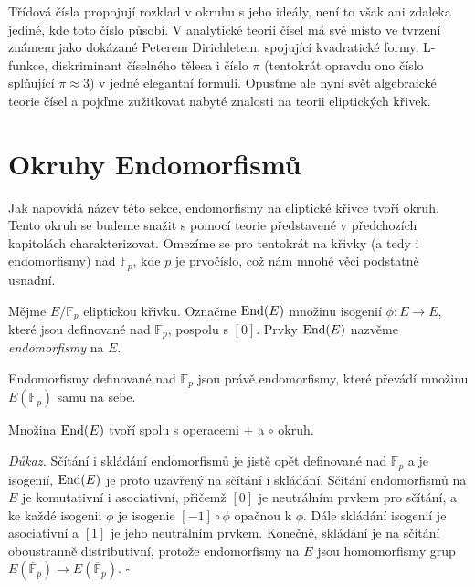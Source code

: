 \documentclass[12pt]{report}
\begin{document}
Třídová čísla propojují rozklad v okruhu s jeho ideály, není to však ani zdaleka jediné, kde toto číslo působí. V analytické teorii čísel má své místo ve tvrzení známem jako  dokázané Peterem Dirichletem, spojující kvadratické formy, L-funkce, diskriminant číselného tělesa i číslo $\pi$ (tentokrát opravdu ono číslo splňující $\pi \approx 3$) v jedné elegantní formuli. Opusťme ale nyní svět algebraické teorie čísel a pojďme zužitkovat nabyté znalosti na teorii eliptických křivek.
 
 
\chapter{Okruhy Endomorfismů} 
 
Jak napovídá název této sekce, endomorfismy na eliptické křivce tvoří okruh. Tento okruh se budeme snažit s pomocí teorie představené v předchozích kapitolách charakterizovat. Omezíme se pro tentokrát na křivky (a tedy i endomorfismy) nad $\mathbb{F}_p$, kde $p$ je prvočíslo, což nám mnohé věci podstatně usnadní.
\begin{definice}
Mějme $E/\mathbb{F}_p$ eliptickou křivku. Označme $\operatorname{End}(E)$ množinu isogenií $\phi : E \longrightarrow E$, které jsou definované nad $\mathbb{F}_p$, pospolu s $[0]$. Prvky $\operatorname{End}(E)$ nazvěme \textit{endomorfismy} na $E$.
\end{definice}

Endomorfismy definované nad $\mathbb{F}_p$ jsou právě endomorfismy, které převádí množinu $E(\mathbb{F}_p)$ samu na sebe. 
 
\begin{veta}
Množina $\operatorname{End}(E)$ tvoří spolu s operacemi $+$ a $\circ$ okruh.
\end{veta}
\noindent \textit{Důkaz.} Sčítání i skládání endomorfismů je jistě opět definované nad $\mathbb{F}_p$ a je isogenií, $\operatorname{End}(E)$ je proto uzavřený na sčítání i skládání. Sčítání endomorfismů na $E$ je komutativní i asociativní, přičemž $[0]$ je neutrálním prvkem pro sčítání, a ke každé isogenii $\phi$ je isogenie $[-1] \circ \phi$ opačnou k $\phi$. Dále skládání isogenií je asociativní a $[1]$ je jeho neutrálním prvkem. Konečně, skládání je na sčítání oboustranně distributivní, protože endomorfismy na $E$ jsou homomorfismy grup $E(\overline{\mathbb{F}}_p) \longrightarrow E(\overline{\mathbb{F}}_p)$. \hfill $\square$\\
\end{document}

